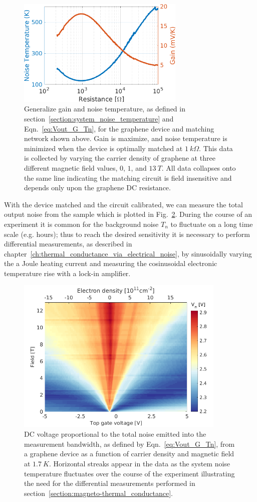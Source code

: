 \begin{figure}
\centering
\includegraphics[width=80mm]{figures/magneto/G_Tn.png}
\caption{Generalize gain and noise temperature, as defined in section~\ref{section:system_noise_temperature} and Eqn.~\ref{eq:Vout_G_Tn}, for the graphene device and matching network shown above. Gain is maximize, and noise temperature is minimized when the device is optimally matched at $1~k\Omega$. This data is collected by varying the carrier density of graphene at three different magnetic field values, $0$, $1$, and $13~T$. All data collapses onto the same line indicating the matching circuit is field insensitive and depends only upon the graphene DC resistance.}
\label{fig:m_G_Tn}
\end{figure}
With the device matched and the circuit calibrated, we can measure the total output noise from the sample which is plotted in Fig.~\ref{fig:m_VNdc}. During the course of an experiment it is common for the background noise $T_n$ to fluctuate on a long time scale (e.g. hours); thus to reach the desired sensitivity it is necessary to perform differential measurements, as described in chapter~\ref{ch:thermal_conductance_via_electrical_noise}, by sinusoidally varying the a Joule heating current and measuring the cosinusoidal electronic temperature rise with a lock-in amplifier.
\begin{figure}
\centering
\includegraphics[width=100mm]{figures/magneto/Fan_VNdc.png}
\caption{DC voltage proportional to the total noise emitted into the measurement bandwidth, as defined by Eqn.~\ref{eq:Vout_G_Tn}, from a graphene device as a function of carrier density and magnetic field at $1.7~K$. Horizontal streaks appear in the data as the system noise temperature fluctuates over the course of the experiment illustrating the need for the differential measurements performed in section~\ref{section:magneto-thermal_conductance}.}
\label{fig:m_VNdc}
\end{figure}

